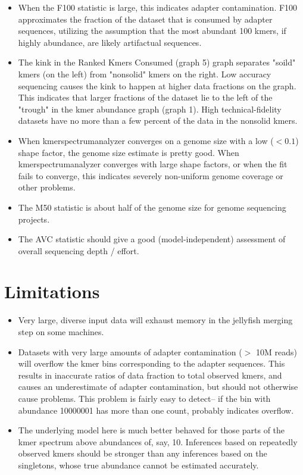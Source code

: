\documentclass[11pt,fullpage]{article}
\begin{document}
\begin{itemize}
\item When the F100 statistic is large, this indicates adapter contamination.
F100 approximates the fraction of the dataset that is consumed by adapter sequences,
utilizing the assumption that the most abundant 100 kmers, if highly abundance, 
are likely artifactual sequences.

\item The kink in the Ranked Kmers Consumed (graph 5) graph separates "soild" kmers
(on the left) from "nonsolid" kmers on the right.  
Low accuracy sequencing causes the kink to happen at higher data fractions on the graph.  
This indicates that larger fractions of the dataset lie to the left of the "trough" in 
the kmer abundance graph (graph 1).
High technical-fidelity datasets have no more than a few percent of the data in the
nonsolid kmers.
\item When kmerspectrumanalyzer converges on a genome size with a low ($< 0.1$) shape
factor, the genome size estimate is pretty good.  When kmerspectrumanalyzer converges
with large shape factors, or when the fit fails to converge, this indicates severely
non-uniform genome coverage or other problems.
\item The M50 statistic is about half of the genome size for genome sequencing projects.
\item The AVC statistic should give a good (model-independent) assessment of overall sequencing
depth / effort.
\end{itemize}

\section{Limitations}
\begin{itemize}
\item Very large, diverse input data will exhaust memory in the jellyfish merging step on some machines. 
\item Datasets with very large amounts of adapter contamination ($>$ 10M reads) will overflow the kmer bins
corresponding to the adapter sequences.  This results in inaccurate ratios of
data fraction to total observed kmers, and causes an underestimate of adapter contamination,
but should not otherwise cause problems.  This problem is fairly easy to detect--
if the bin with abundance 10000001 has more than one count, probably indicates overflow.
\item  The underlying model here is much better behaved for those parts of the kmer spectrum
above abundances of, say, 10.  Inferences based on repeatedly observed kmers should
be stronger than any inferences based on the singletons, whose true abundance cannot be 
estimated accurately.
\end{itemize}
\end{document}
